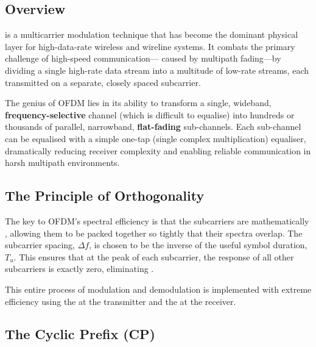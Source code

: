 \subsection{Overview}

 is a multicarrier modulation technique that has become the dominant physical layer for high-data-rate wireless and wireline systems. It combats the primary challenge of high-speed communication— caused by multipath fading—by dividing a single high-rate data stream into a multitude of low-rate streams, each transmitted on a separate, closely spaced subcarrier.

\begin{keyconcept}
    The genius of OFDM lies in its ability to transform a single, wideband, \textbf{frequency-selective} channel (which is difficult to equalise) into hundreds or thousands of parallel, narrowband, \textbf{flat-fading} sub-channels. Each sub-channel can be equalised with a simple one-tap (single complex multiplication) equaliser, dramatically reducing receiver complexity and enabling reliable communication in harsh multipath environments.
\end{keyconcept}


\subsection{The Principle of Orthogonality}

The key to OFDM's spectral efficiency is that the subcarriers are mathematically , allowing them to be packed together so tightly that their spectra overlap. The subcarrier spacing, $\Delta f$, is chosen to be the inverse of the useful symbol duration, $T_u$. This ensures that at the peak of each subcarrier, the response of all other subcarriers is exactly zero, eliminating .

This entire process of modulation and demodulation is implemented with extreme efficiency using the  at the transmitter and the  at the receiver.


\subsection{The Cyclic Prefix (CP)}

